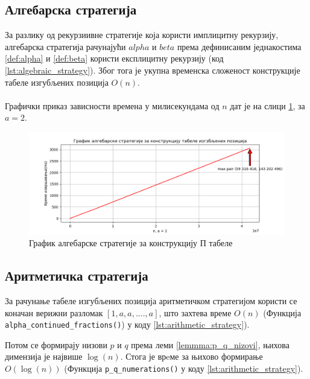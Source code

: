 \documentclass[a4paper]{article}
\begin{document}
\subsection{Алгебарска стратегија}

За разлику од рекурзиивне стратегије која користи имплицитну рекурзију, алгебарска стратегија рачунајући $ alpha $ и $ beta $ према дефинисаним једнакостима \eqref{def:alpha} и \eqref{def:beta} користи експлицитну рекурзију (код \ref{lst:algebraic_strategy}). Због тога је укупна временска сложеност конструкције табеле изгубљених позиција $ O(n) $.\\



\leavevmode\\
Графички приказ зависности времена у милисекундама од $ n $ дат је на слици \ref{fig:algebraic}, за $ a = 2 $.

\begin{figure}[H]
	\begin{center}
		\includegraphics[width=\textwidth]{algebraic.png}
	\end{center}
	\caption{График алгебарске стратегије за конструкцију П табеле}
	\label{fig:algebraic}
\end{figure}

\subsection{Аритметичка стратегија}

За рачунање табеле изгубљених позиција аритметичком стратегијом користи се коначан верижни разломак $ [1, a, a, ...., a] $, што захтева време $ O(n) $ (Функција \verb|alpha_continued_fractions()|) у коду \ref{lst:arithmetic_strategy}).

Потом се формирају низови $ p $ и $ q $ према леми \ref{lemmma:p_q_nizovi}, њихова димензија је највише $ \log(n) $. Стога је врeме за њихово формирање $ O(\log(n)) $ (Функција \verb|p_q_numerations()| у коду \ref{lst:arithmetic_strategy}).
\end{document}
